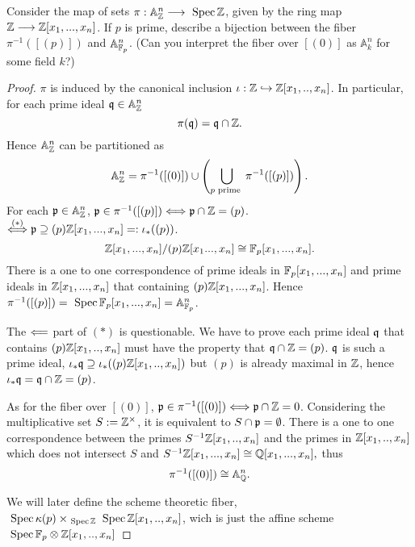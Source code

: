 \begin{exr}
Consider the map of sets $\pi: \mathbb{A}^n_\mathbb Z \longrightarrow  \text{ Spec\,} \mathbb Z$,
given by the ring map $\mathbb Z \longrightarrow \mathbb Z[x_1,..., x_n]$. If $p$ is prime, describe a bijection between the fiber $\pi^{-1}([(p)])$ and $\mathbb{A}^n_{\mathbb F_p}$.
(Can you interpret the fiber over $[(0)]$ as $\mathbb{A}^n_{k}$ for some field $k$?)
\end{exr}
\begin{proof}
$\pi$ is induced by the canonical inclusion $\iota:\mathbb Z\hookrightarrow \mathbb Z[x_1,..,x_n]$. In particular, for each prime ideal $\mathfrak q\in \mathbb{A}^n_\mathbb Z$
$$
\pi(\mathfrak q)=\mathfrak q\cap\mathbb Z.
$$
Hence $\mathbb{A}^{n}_\mathbb Z$ can be partitioned as 
$$\mathbb{A}^n_\mathbb Z
=\pi^{-1}([(0)])\cup \left(\bigcup_{p\text{ prime }}\pi^{-1}([(p)])\right).
$$
For each ${\mathfrak p}\in \mathbb{A}^n_\mathbb Z$, ${\mathfrak p}\in \pi^{-1}([(p)])\Longleftrightarrow {\mathfrak p}\cap\mathbb Z=(p)$.\\
$\overset{(*)}{\Longleftrightarrow}{\mathfrak p}\supseteq (p)\mathbb Z[x_1,...,x_n]=:\iota_*((p))$.
$$
\mathbb Z[x_1,...,x_n]/(p)\mathbb Z[x_1...,x_n]\cong \mathbb F_p[x_1,...,x_n].
$$
There is a one to one correspondence of prime ideals in $\mathbb F_p[x_1,...,x_n]$ and prime ideals in $\mathbb Z[x_1,...,x_n]$ that containing $(p)\mathbb Z[x_1,...,x_n]$. Hence $\pi^{-1}([(p)])=\text{ Spec\,} \mathbb F_p[x_1,...,x_n]=\mathbb A_{\mathbb F_p}^n$.

The $\Longleftarrow$ part of $(*)$ is questionable. We have to prove each prime ideal $\mathfrak q$ that contains $(p)\mathbb Z[x_1,..,x_n]$ must have the property that $\mathfrak q\cap\mathbb Z=(p)$. $\mathfrak q$ is such a prime ideal, $\iota_*\mathfrak q\supseteq\iota_*((p)\mathbb Z[x_1,..,x_n])$ but $(p)$ is already maximal in $\mathbb Z$, hence $\iota_*\mathfrak q=\mathfrak q\cap\mathbb Z=(p)$.

As for the fiber over $[(0)]$, ${\mathfrak p}\in\pi^{-1}([(0)])\Longleftrightarrow {\mathfrak p}\cap \mathbb Z=0$.
 Considering the multiplicative set $S:=\mathbb Z^\times$, it is equivalent to $S\cap{\mathfrak p}=\emptyset$. There is a one to one correspondence between the primes $S^{-1}\mathbb Z[x_1,..,x_n]$ and the primes in $\mathbb Z[x_1,..,x_n]$ which does not intersect $S$ and 
 $
S^{-1}\mathbb Z[x_1,...,x_n]\cong \mathbb Q[x_1,...,x_n],
 $   
 thus 
 $$
\pi^{-1}([(0)])\cong \mathbb A^n_\mathbb Q.
 $$

 We will later define the scheme theoretic fiber, $\text{ Spec\,}  \kappa(p)\times_{\text{ Spec\,} \mathbb Z}\text{ Spec\,} \mathbb Z[x_1,..,x_n]$, wich is just the affine scheme $\text{ Spec\,} \mathbb F_p\otimes\mathbb Z[x_1,..,x_n]$

\end{proof}

